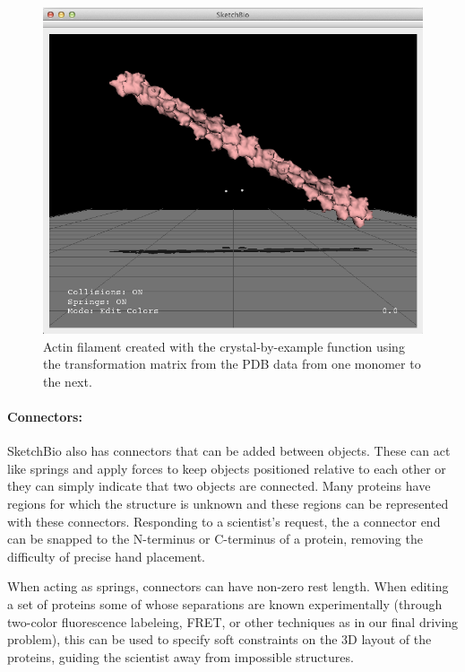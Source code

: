 \documentclass[twocolumn]{bmcart}%
\begin{document}
\begin{figure}[h]
\centering
\includegraphics[width=0.9\columnwidth]{crystal_actin.png}
\caption{Actin filament created with the crystal-by-example function using the transformation matrix from the PDB data from one monomer to the next.}
\label{fig:crystal_actin}
\end{figure}


\paragraph*{Connectors:}
SketchBio also has connectors that can be added between objects.
These can act like springs and apply forces to keep objects positioned relative to each other or they can simply indicate that two objects are connected.
Many proteins have regions for which the structure is unknown and these regions can be represented with these connectors.
Responding to a scientist's request, the a connector end can be snapped to the N-terminus or C-terminus of a protein, removing the difficulty of precise hand placement.

When acting as springs, connectors can have non-zero rest length.
When editing a set of proteins some of whose separations are known experimentally (through two-color fluorescence labeleing, FRET, or other techniques as in our final driving problem), this can be used to specify soft constraints on the 3D layout of the proteins, guiding the scientist away from impossible structures.
\end{document}
